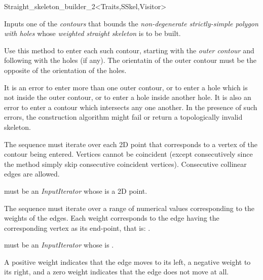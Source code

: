 \begin{ccRefClass}{Straight_skeleton_builder_2<Traits,SSkel,Visitor>}
{Inputs one of the \textit{contours} that bounds the \textit{non-degenerate strictly-simple polygon with holes} whose
 \textit{weighted straight skeleton} is to be built. 

Use this method to enter each such contour, starting with the \textit{outer contour} and following with the holes (if any). 
The orientatin of the outer contour must be the opposite of the orientation of the holes.

It is an error to enter more than one outer contour, or to enter a hole which is not inside the outer contour, or to enter a hole inside another hole.
It is also an error to enter a contour which intersects any one another. In the presence of such errors, the construction algorithm might fail or return
a topologically invalid skeleton.

The sequence \ccc{[aPBegin,aPEnd)} must iterate over each 2D point that corresponds to a vertex of the contour being entered. Vertices cannot be
coincident (except consecutively since the method simply skip consecutive coincident vertices). Consecutive collinear edges are allowed.

 must be an \textit{InputIterator} whose  is a 2D point.

The sequence \ccc{[aWBegin,aWEnd)} must iterate over a range of numerical values corresponding to the weights of the edges.
Each weight  corresponds to the edge having the corresponding vertex as its end-point, that is: .

 must be an \textit{InputIterator} whose  is .

A positive weight indicates that the edge moves to its left, a negative weight to its right, and a zero weight indicates that the edge does not move at all. 

}
\end{ccRefClass}
